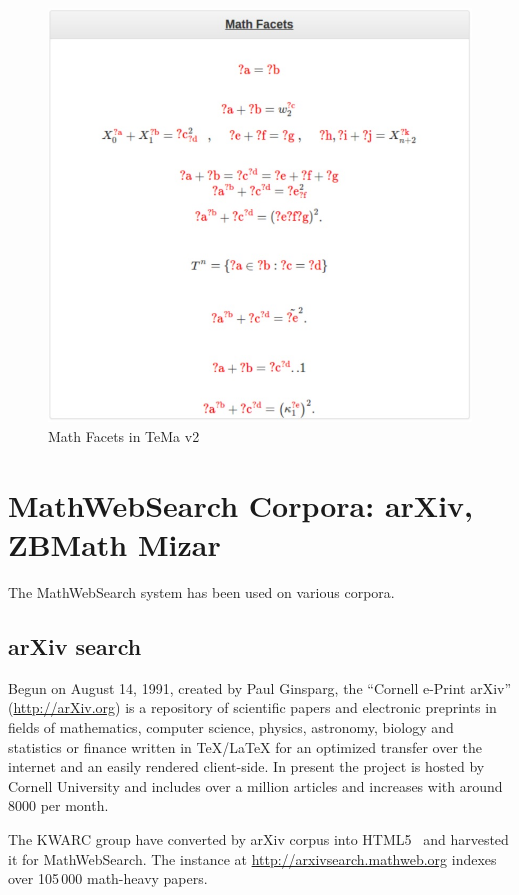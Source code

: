 \documentclass{deliverablereport}
\begin{document}
\begin{figure}[H]
\centering
 \includegraphics[scale=0.8]{figure10.jpg}
 \caption{Math Facets in TeMa v2}
 \label{fig:facets_temav2}
\end{figure}

\section{MathWebSearch Corpora: arXiv, ZBMath Mizar}\label{arxiv}

The MathWebSearch system has been used on various corpora. 

\subsection{arXiv search}

Begun on August 14, 1991, created by Paul Ginsparg, the ``Cornell e-Print arXiv''
(\url{http://arXiv.org}) is a repository of scientific papers and electronic preprints in
fields of mathematics, computer science, physics, astronomy, biology and statistics or
finance written in {\TeX/\LaTeX} for an optimized transfer over the internet and an easily
rendered client-side. In present the project is hosted by Cornell University and includes
over a million articles and increases with around 8000 per month.

The KWARC group have converted by arXiv corpus into HTML5~\cite{StaKoh:tlcspx10} and
harvested it for MathWebSearch. The instance at \url{http://arxivsearch.mathweb.org}
indexes over 105\,000 math-heavy papers.
\end{document}
